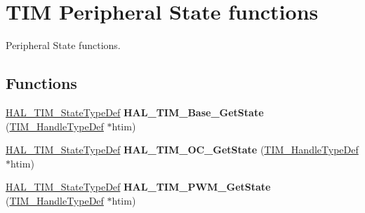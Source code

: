 \hypertarget{group___t_i_m___exported___functions___group10}{}\section{T\+IM Peripheral State functions}
\label{group___t_i_m___exported___functions___group10}


Peripheral State functions.  


\subsection*{Functions}
\begin{DoxyCompactItemize}
\item 
\mbox{\label{group___t_i_m___exported___functions___group10_gabf71ed10e30d23139f7b327878901c89}} 
\mbox{\hyperlink{group___t_i_m___exported___types_gae0994cf5970e56ca4903e9151f40010c}{H\+A\+L\+\_\+\+T\+I\+M\+\_\+\+State\+Type\+Def}} {\bfseries H\+A\+L\+\_\+\+T\+I\+M\+\_\+\+Base\+\_\+\+Get\+State} (\mbox{\hyperlink{struct_t_i_m___handle_type_def}{T\+I\+M\+\_\+\+Handle\+Type\+Def}} $\ast$htim)
\item 
\mbox{\label{group___t_i_m___exported___functions___group10_ga9dbca6a4ca949a13fda097d9cc7959a0}} 
\mbox{\hyperlink{group___t_i_m___exported___types_gae0994cf5970e56ca4903e9151f40010c}{H\+A\+L\+\_\+\+T\+I\+M\+\_\+\+State\+Type\+Def}} {\bfseries H\+A\+L\+\_\+\+T\+I\+M\+\_\+\+O\+C\+\_\+\+Get\+State} (\mbox{\hyperlink{struct_t_i_m___handle_type_def}{T\+I\+M\+\_\+\+Handle\+Type\+Def}} $\ast$htim)
\item 
\mbox{\label{group___t_i_m___exported___functions___group10_ga207c64afb37d15e35b5380d4805e6eaf}} 
\mbox{\hyperlink{group___t_i_m___exported___types_gae0994cf5970e56ca4903e9151f40010c}{H\+A\+L\+\_\+\+T\+I\+M\+\_\+\+State\+Type\+Def}} {\bfseries H\+A\+L\+\_\+\+T\+I\+M\+\_\+\+P\+W\+M\+\_\+\+Get\+State} (\mbox{\hyperlink{struct_t_i_m___handle_type_def}{T\+I\+M\+\_\+\+Handle\+Type\+Def}} $\ast$htim)
\item 
\mbox{\label{group___t_i_m___exported___functions___group10_ga8f6d20b8e4f3255f1f0f3ced8ea684e8}} 

\end{DoxyCompactItemize}
